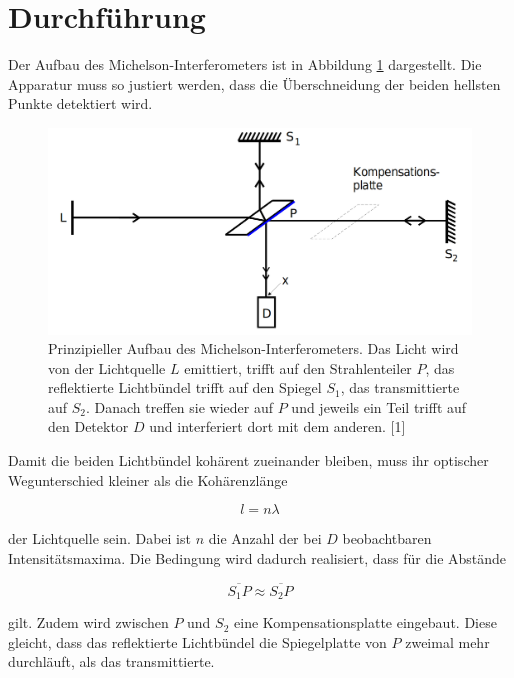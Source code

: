 \section{Durchführung}
\label{sec:Durchführung}

Der Aufbau des Michelson-Interferometers ist in Abbildung \ref{fig:bild1} dargestellt.
Die Apparatur muss so justiert werden, dass die Überschneidung der beiden hellsten Punkte detektiert wird.

\begin{figure}
    \centering
    \includegraphics[scale = 0.2]{content/bild1.png}
    \caption{Prinzipieller Aufbau des Michelson-Interferometers.
            Das Licht wird von der Lichtquelle $L$ emittiert, trifft auf den Strahlenteiler $P$, das reflektierte
            Lichtbündel trifft auf den Spiegel $S_1$, das transmittierte auf $S_2$. Danach treffen sie wieder auf 
            $P$ und jeweils ein Teil trifft auf den Detektor $D$ und interferiert dort mit dem anderen. [1]}
    \label{fig:bild1}
  \end{figure}

Damit die beiden Lichtbündel kohärent zueinander bleiben, muss ihr optischer Wegunterschied kleiner als
die Kohärenzlänge 

\begin{equation}
  l = n \lambda
\end{equation}

der Lichtquelle sein. Dabei ist $n$ die Anzahl der bei $D$ beobachtbaren Intensitätsmaxima. 
Die Bedingung wird dadurch realisiert, dass für die Abstände

\begin{equation}
    \overline{S_1 P} \approx \overline{S_2 P}
    \label{eqn:approx}
\end{equation}

gilt. Zudem wird zwischen $P$ und $S_2$ eine Kompensationsplatte eingebaut. Diese gleicht, dass das reflektierte
Lichtbündel die Spiegelplatte von $P$ zweimal mehr durchläuft, als das transmittierte.

